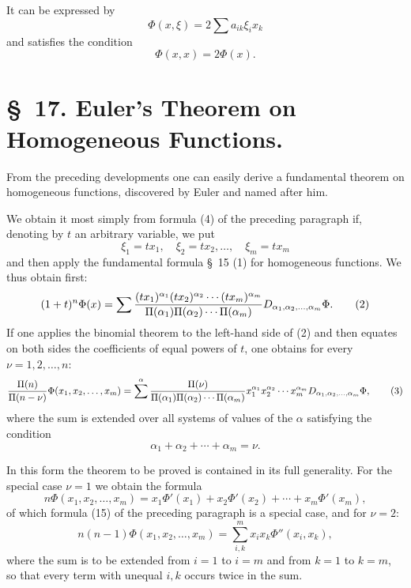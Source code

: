 \documentclass[11pt]{article}
\begin{document}
It can be expressed by
\begin{equation}
 \Phi(x,\xi)=2\sum a_{ik}\xi_i x_k
\tag{14}
\end{equation}
and satisfies the condition
\begin{equation}
 \Phi(x,x)=2\Phi(x).
\tag{15}
\end{equation}

\section*{\S~17. Euler's Theorem on Homogeneous Functions.}

From the preceding developments one can easily derive a fundamental theorem on homogeneous functions, discovered by Euler and named after him.

We obtain it most simply from formula (4) of the preceding paragraph if, denoting by $t$ an arbitrary variable, we put
\begin{equation}
 \xi_1=tx_1,\quad \xi_2=tx_2,\ldots,\quad \xi_m=tx_m
\tag{1}
\end{equation}
and then apply the fundamental formula \S~15 (1) for homogeneous functions. We thus obtain first:
\begin{equation}
 (1+t)^n\Phi(x)
 =
 \sum { (tx_1)^{\alpha_1}(tx_2)^{\alpha_2}\cdots(tx_m)^{\alpha_m}
 \over \Pi(\alpha_1)\Pi(\alpha_2)\cdots\Pi(\alpha_m)}
 D_{\alpha_1,\alpha_2,\ldots,\alpha_m}\Phi.
\tag{2}
\end{equation}
If one applies the binomial theorem to the left-hand side of (2) and then equates on both sides the coefficients of equal powers of $t$, one obtains for every $\nu=1,2,\ldots,n$:
\begin{equation}
 {\Pi(n)\over\Pi(n-\nu)}\Phi(x_1,x_2,\ldots,x_m)
 =
 \sum^{\alpha}
 {\Pi(\nu)\over\Pi(\alpha_1)\Pi(\alpha_2)\cdots\Pi(\alpha_m)}
 x_1^{\alpha_1}x_2^{\alpha_2}\cdots x_m^{\alpha_m}
 D_{\alpha_1,\alpha_2,\ldots,\alpha_m}\Phi,
\tag{3}
\end{equation}
where the sum is extended over all systems of values of the $\alpha$ satisfying the condition
\begin{equation}
 \alpha_1+\alpha_2+\cdots+\alpha_m=\nu.
\tag{4}
\end{equation}

In this form the theorem to be proved is contained in its full generality. For the special case $\nu=1$ we obtain the formula
\begin{equation}
 n\Phi(x_1,x_2,\ldots,x_m)
 =x_1\Phi'(x_1)+x_2\Phi'(x_2)+\cdots+x_m\Phi'(x_m),
\tag{5}
\end{equation}
of which formula (15) of the preceding paragraph is a special case, and for $\nu=2$:
\begin{equation}
 n(n-1)\Phi(x_1,x_2,\ldots,x_m)
 =
 \sum_{i,k}^{m}x_i x_k\Phi''(x_i,x_k),
\tag{6}
\end{equation}
where the sum is to be extended from $i=1$ to $i=m$ and from $k=1$ to $k=m$, so that every term with unequal $i,k$ occurs twice in the sum.
\end{document}
